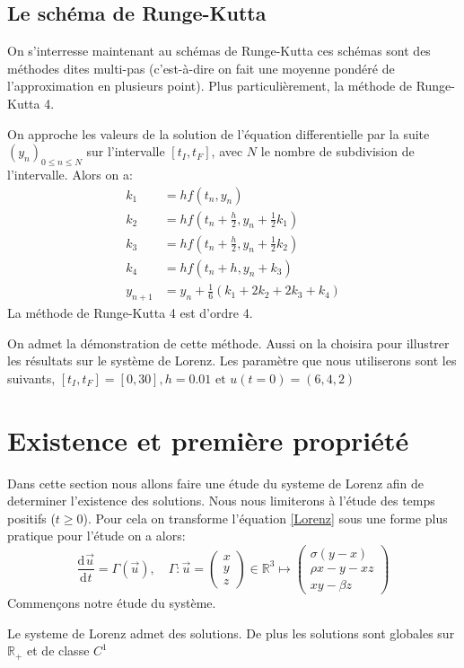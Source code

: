 \documentclass{article}
\newcommand*\colv[1]{
\left(\begin{array}{c}
    #1
\end{array}\right)
}
\newcommand{\R}{\mathbb{R}}
\newcommand{\deriv}[3][ ]{
    \ensuremath{\frac{\mathrm{d}^{#1}#2}{\mathrm{d}^{#1} #3}}
}
\newcommand{\cad}{c'est-\`a-dire }
\newtheorem[M , nocut]{prop}{Proposition}[section]
\newtheorem[M]{propt}{Propriété}[section]
\newtheorem[L , nocut]{thm}{Théoreme}
\newtheorem[L]{cor}{Corollaire}
\begin{document}
\subsection*{Le schéma de Runge-Kutta}
On s'interresse maintenant au schémas de Runge-Kutta ces schémas sont des méthodes dites multi-pas (\cad on fait une moyenne pondéré de l'approximation en plusieurs point). Plus particulièrement, la méthode de Runge-Kutta 4.
\begin{thm}
    On approche les valeurs de la solution de l'équation differentielle par la suite $(y_n)_{0\le n \le N}$ sur l'intervalle $[t_I,t_F]$, avec $N$ le nombre de subdivision de l'intervalle. Alors on a: 
    \begin{align*}
    k_1 &= h f(t_n, y_n) \\
    k_2 &= h f\left(t_n + \frac{h}{2}, y_n + \frac{1}{2}k_1\right) \\
    k_3 &= h f\left(t_n + \frac{h}{2}, y_n + \frac{1}{2}k_2\right) \\
    k_4 &= h f(t_n + h, y_n + k_3)\\
    y_{n+1} &= y_n + \frac{1}{6}(k_1 + 2k_2 + 2k_3 + k_4) 
    \end{align*}
    La méthode de Runge-Kutta 4 est d'ordre 4.
\end{thm}
On admet la démonstration de cette méthode. Aussi on la choisira pour illustrer les résultats sur le système de Lorenz. Les paramètre que nous utiliserons sont les suivants, $[t_I,t_F] = [0,30], h = 0.01 \text{ et }u(t=0)= (6,4,2)$
\vfill

\section{Existence et première propriété}

Dans cette section nous allons faire une étude du systeme de Lorenz afin de determiner l'existence des solutions. Nous nous limiterons à l'étude des temps positifs ($t \ge 0$). Pour cela on transforme l'équation \eqref{Lorenz} sous une forme plus pratique pour l'étude on a alors:
\begin{equation}
    \label{fLorenz}
    \deriv{\Vec{u}}{t} = \Gamma(\Vec{u}), \quad
    \Gamma : \Vec{u} = \colv{x\\y\\z} \in \R^3 \mapsto \colv{\sigma(y-x) \\ \rho x-y-xz \\ xy-\beta z}
    \end{equation}
Commençons notre étude du système.
\begin{prop}
    Le systeme de Lorenz admet des solutions. De plus les solutions sont globales sur $\R_+$ et de classe $C^1$
\end{prop}
\end{document}
